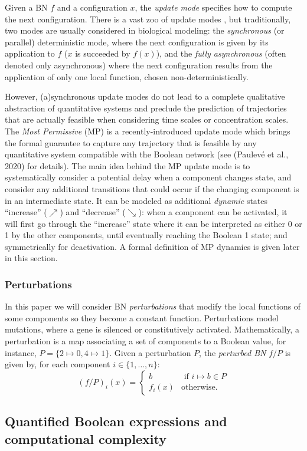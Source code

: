 \documentclass[PCJ,Unicode,screen,mode=plain]{cedram}
\begin{document}
Given a BN \(f\) and a configuration \(x\), the \emph{update mode}
specifies how to compute the next configuration. There is a vast zoo of
update modes \citep{PS22}, but traditionally, two modes are usually
considered in biological modeling: the \emph{synchronous} (or parallel)
deterministic mode, where the next configuration is given by its
application to \(f\) (\(x\) is succeeded by \(f(x)\)), and the
\emph{fully asynchronous} (often denoted only asynchronous) where the
next configuration results from the application of only one local
function, chosen non-deter\-ministically.

However, (a)synchronous update modes do not lead to a complete
qualitative abstraction of quantitative systems and preclude the
prediction of trajectories that are actually feasible when considering
time scales or concentration scales. The \emph{Most Permissive} (MP)
\citep{Pauleve2020,Pauleve2021} is a recently-introduced update mode
which brings the formal guarantee to capture any trajectory that is
feasible by any quantitative system compatible with the Boolean network
(see (Paulevé et al., 2020) for details). The main idea behind the MP
update mode is to systematically consider a potential delay when a
component changes state, and consider any additional transitions that
could occur if the changing component is in an intermediate state. It
can be modeled as additional \emph{dynamic} states ``increase''
(\(\nearrow\)) and ``decrease'' (\(\searrow\)): when a component can be
activated, it will first go through the ``increase'' state where it can
be interpreted as either 0 or 1 by the other components, until
eventually reaching the Boolean 1 state; and symmetrically for
deactivation. A formal definition of MP dynamics is given later in this
section.

\hypertarget{perturbations}{%
\subsubsection{Perturbations}\label{perturbations}}

In this paper we will consider BN \emph{perturbations} that modify the
local functions of some components so they become a constant function.
Perturbations model mutations, where a gene is silenced or
constitutively activated. Mathematically, a perturbation is a map
associating a set of components to a Boolean value, for instance,
\(P = \{ 2 \mapsto 0, 4 \mapsto 1\}\). Given a perturbation \(P\), the
\emph{perturbed BN} \(f/P\) is given by, for each component
\(i\in \{1,\ldots,n\}\): \[
(f/P)_i(x) = \begin{cases}
b & \text{ if }i \mapsto b \in P\\
f_i(x) & \text{otherwise.}
\end{cases}
\]
\hypertarget{quantified-boolean-expressions-and-computational-complexity}{%
\subsection{Quantified Boolean expressions and computational
complexity}\label{quantified-boolean-expressions-and-computational-complexity}}
\end{document}
